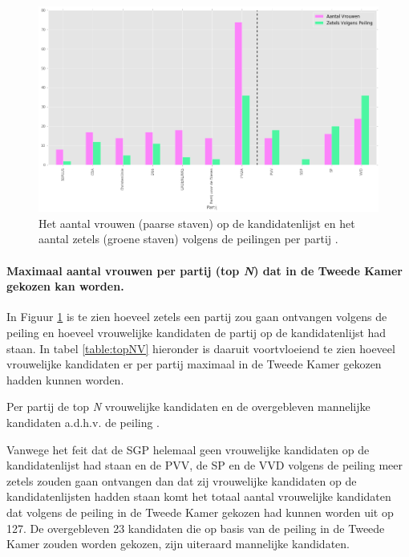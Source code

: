 \begin{figure}[H]

	\includegraphics[width=\linewidth]	{Aantal_vrouwen_aantal_zetels.png}

			\caption{Het aantal vrouwen (paarse staven) op de kandidatenlijst \citep{Kiesraad_kandidatenlijsten} en het aantal zetels (groene staven) volgens de peilingen per partij \citep{IPSOS}.}

	\label{fig:zetelsV}
\end{figure}

\paragraph{Maximaal aantal vrouwen per partij (top \textit{N}) dat in de Tweede Kamer gekozen kan worden.}
In Figuur \ref{fig:zetelsV} is te zien hoeveel zetels een partij zou gaan ontvangen volgens de peiling en hoeveel vrouwelijke kandidaten de partij op de kandidatenlijst had staan. In tabel \ref{table:topNV} hieronder is daaruit voortvloeiend te zien hoeveel vrouwelijke kandidaten er per partij maximaal in de Tweede Kamer gekozen hadden kunnen worden.  


\begin{table}[h]
\centering
	\begin{footnotesize}
		
	\end{footnotesize}
			\caption{Per partij de top \textit{N} vrouwelijke kandidaten en de overgebleven mannelijke kandidaten a.d.h.v. de peiling \citep{IPSOS}.}
\label{table:topNV} 
\end{table}

Vanwege het feit dat de SGP helemaal geen vrouwelijke kandidaten op de kandidatenlijst had staan en de PVV, de SP en de VVD volgens de peiling meer zetels zouden gaan ontvangen dan dat zij vrouwelijke kandidaten op de kandidatenlijsten hadden staan komt het totaal aantal vrouwelijke kandidaten dat volgens de peiling in de Tweede Kamer gekozen had kunnen worden uit op 127. De overgebleven 23 kandidaten die op basis van de peiling in de Tweede Kamer zouden worden gekozen, zijn uiteraard mannelijke kandidaten.

